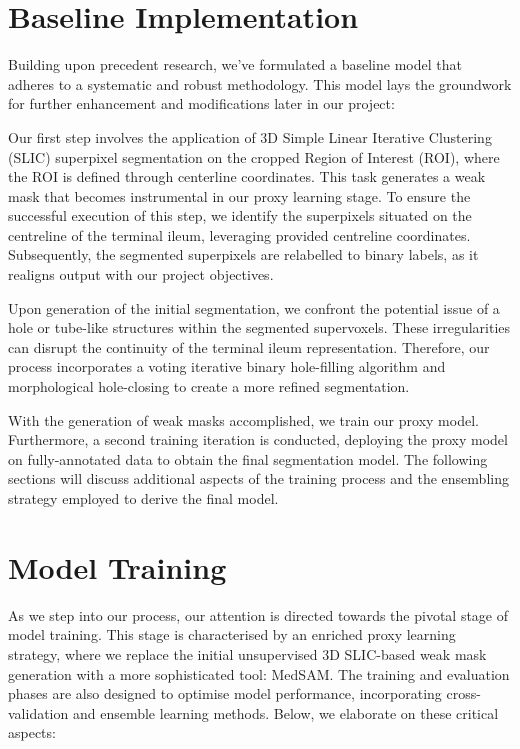 \section{Baseline Implementation}

Building upon precedent research, we've formulated a baseline model that adheres to a systematic and robust methodology. This model lays the groundwork for further enhancement and modifications later in our project:

Our first step involves the application of 3D Simple Linear Iterative Clustering (SLIC) superpixel segmentation on the cropped Region of Interest (ROI), where the ROI is defined through centerline coordinates. This task generates a weak mask that becomes instrumental in our proxy learning stage. To ensure the successful execution of this step, we identify the superpixels situated on the centreline of the terminal ileum, leveraging provided centreline coordinates. Subsequently, the segmented superpixels are relabelled to binary labels, as it realigns output with our project objectives.

Upon generation of the initial segmentation, we confront the potential issue of a hole or tube-like structures within the segmented supervoxels. These irregularities can disrupt the continuity of the terminal ileum representation. Therefore, our process incorporates a voting iterative binary hole-filling algorithm and morphological hole-closing to create a more refined segmentation.

With the generation of weak masks accomplished, we train our proxy model. Furthermore, a second training iteration is conducted, deploying the proxy model on fully-annotated data to obtain the final segmentation model. The following sections will discuss additional aspects of the training process and the ensembling strategy employed to derive the final model.

\section{Model Training}
As we step into our process, our attention is directed towards the pivotal stage of model training. This stage is characterised by an enriched proxy learning strategy, where we replace the initial unsupervised 3D SLIC-based weak mask generation with a more sophisticated tool: MedSAM. The training and evaluation phases are also designed to optimise model performance, incorporating cross-validation and ensemble learning methods. Below, we elaborate on these critical aspects:

